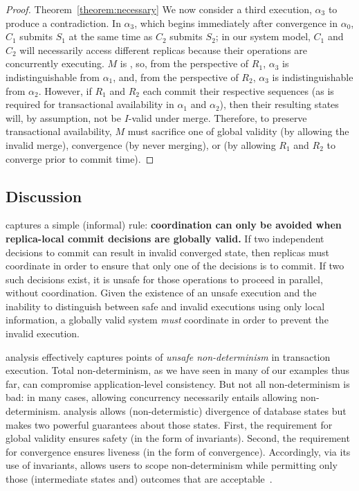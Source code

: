 \begin{proof}{Theorem~\ref{theorem:necessary}}
   We now consider a third execution, $\alpha_3$ to produce a
   contradiction. In $\alpha_3$, which begins immediately after
   convergence in $\alpha_0$, $C_1$ submits $S_1$ at the same time as
   $C_2$ submits $S_2$; in our system model, $C_1$ and $C_2$ will
   necessarily access different replicas because their operations are
   concurrently executing. $M$ is \cfree, so, from the perspective of
   $R_1$, $\alpha_3$ is indistinguishable from $\alpha_1$, and, from
   the perspective of $R_2$, $\alpha_3$ is indistinguishable from
   $\alpha_2$. However, if $R_1$ and $R_2$ each commit their
   respective sequences (as is required for transactional availability
   in $\alpha_1$ and $\alpha_2$), then their resulting states will, by
   assumption, not be $I$-valid under merge. Therefore, to preserve
   transactional availability, $M$ must sacrifice one of global
   validity (by allowing the invalid merge), convergence (by never
   merging), or \cfreedom (by allowing $R_1$ and $R_2$ to converge
   prior to commit time).
\end{proof}

\subsection{Discussion}

\iconfluence captures a simple (informal) rule: \textbf{coordination
  can only be avoided when replica-local commit decisions are globally
  valid.} If two independent decisions to commit can result in invalid
converged state, then replicas must coordinate in order to ensure that
only one of the decisions is to commit. If two such decisions exist,
it is unsafe for those operations to proceed in parallel, without
coordination. Given the existence of an unsafe execution and the
inability to distinguish between safe and invalid executions using
only local information, a globally valid system \textit{must}
coordinate in order to prevent the invalid execution.

\iconfluence analysis effectively captures points of \textit{unsafe
  non-determinism} in transaction execution. Total non-determinism, as
we have seen in many of our examples thus far, can compromise
application-level consistency. But not all non-determinism is bad: in
many cases, allowing concurrency necessarily entails allowing
non-determinism. \iconfluence analysis allows (non-determistic)
divergence of database states but makes two powerful guarantees about
those states. First, the requirement for global validity ensures
safety (in the form of invariants). Second, the requirement for
convergence ensures liveness (in the form of
convergence). Accordingly, via its use of invariants, \iconfluence
allows users to scope non-determinism while permitting only those
(intermediate states and) outcomes that are
acceptable~\cite{consistency-borders}.

